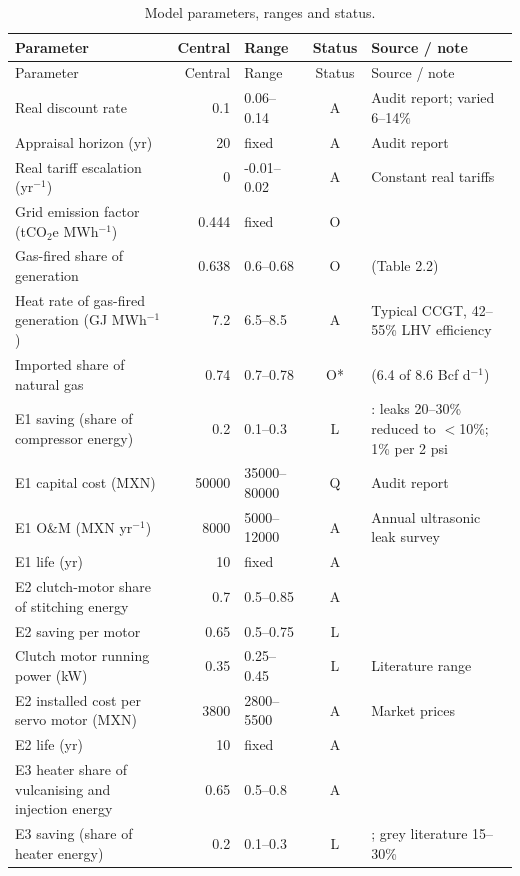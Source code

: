 {\footnotesize
\begin{longtable}{p{4.4cm}rlcp{4.0cm}}
\caption{Model parameters, ranges and status.}\label{tab:parameters}\\
\toprule
Parameter & Central & Range & Status & Source / note \\
\midrule
\endfirsthead
\toprule
Parameter & Central & Range & Status & Source / note \\
\midrule
\endhead
Real discount rate & 0.1 & 0.06--0.14 & A & Audit report; varied 6--14\% \\
Appraisal horizon (yr) & 20 & fixed & A & Audit report \\
Real tariff escalation (yr$^{-1}$) & 0 & -0.01--0.02 & A & Constant real tariffs \\
Grid emission factor (tCO$_2$e MWh$^{-1}$) & 0.444 & fixed & O & \citet{semarnat2025fesen} \\
Gas-fired share of generation & 0.638 & 0.6--0.68 & O & \citet{sener2025plan} (Table 2.2) \\
Heat rate of gas-fired generation (GJ MWh$^{-1}$) & 7.2 & 6.5--8.5 & A & Typical CCGT, 42--55\% LHV efficiency \\
Imported share of natural gas & 0.74 & 0.7--0.78 & O* & \citet{eia2025mexico} (6.4 of 8.6 Bcf d$^{-1}$) \\
E1 saving (share of compressor energy) & 0.2 & 0.1--0.3 & L & \citet{doe2016compressed}: leaks 20--30\% reduced to $<$10\%; 1\% per 2 psi \\
E1 capital cost (MXN) & 50000 & 35000--80000 & Q & Audit report \\
E1 O\&M (MXN yr$^{-1}$) & 8000 & 5000--12000 & A & Annual ultrasonic leak survey \\
E1 life (yr) & 10 & fixed & A &  \\
E2 clutch-motor share of stitching energy & 0.7 & 0.5--0.85 & A &  \\
E2 saving per motor & 0.65 & 0.5--0.75 & L & \citet{nemesa2023} \\
Clutch motor running power (kW) & 0.35 & 0.25--0.45 & L & Literature range \\
E2 installed cost per servo motor (MXN) & 3800 & 2800--5500 & A & Market prices \\
E2 life (yr) & 10 & fixed & A &  \\
E3 heater share of vulcanising and injection energy & 0.65 & 0.5--0.8 & A &  \\
E3 saving (share of heater energy) & 0.2 & 0.1--0.3 & L & \citet{kent2018}; grey literature 15--30\% \\

\end{longtable}}
